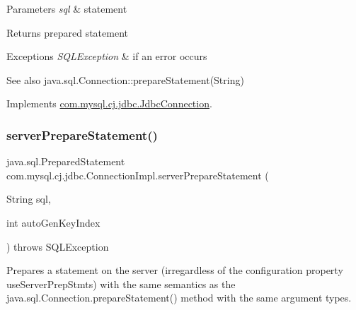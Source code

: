 \begin{DoxyParams}{Parameters}
{\em sql} & statement \\
\hline
\end{DoxyParams}
\begin{DoxyReturn}{Returns}
prepared statement 
\end{DoxyReturn}

\begin{DoxyExceptions}{Exceptions}
{\em S\+Q\+L\+Exception} & if an error occurs \\
\hline
\end{DoxyExceptions}
\begin{DoxySeeAlso}{See also}
java.\+sql.\+Connection\+::prepare\+Statement(\+String) 
\end{DoxySeeAlso}


Implements \mbox{\hyperlink{interfacecom_1_1mysql_1_1cj_1_1jdbc_1_1_jdbc_connection_add415475386bd7577301fddbdd5518b8}{com.\+mysql.\+cj.\+jdbc.\+Jdbc\+Connection}}.

\mbox{\label{classcom_1_1mysql_1_1cj_1_1jdbc_1_1_connection_impl_abd651a25d34961e6b9e8b5938f57222f}} 
\subsubsection{\texorpdfstring{server\+Prepare\+Statement()}{serverPrepareStatement()}\hspace{0.1cm}{\footnotesize\ttfamily [2/6]}}
{\footnotesize\ttfamily java.\+sql.\+Prepared\+Statement com.\+mysql.\+cj.\+jdbc.\+Connection\+Impl.\+server\+Prepare\+Statement (\begin{DoxyParamCaption}\item[{String}]{sql,  }\item[{int}]{auto\+Gen\+Key\+Index }\end{DoxyParamCaption}) throws S\+Q\+L\+Exception}

Prepares a statement on the server (irregardless of the configuration property \textquotesingle{}use\+Server\+Prep\+Stmts\textquotesingle{}) with the same semantics as the java.\+sql.\+Connection.\+prepare\+Statement() method with the same argument types.


